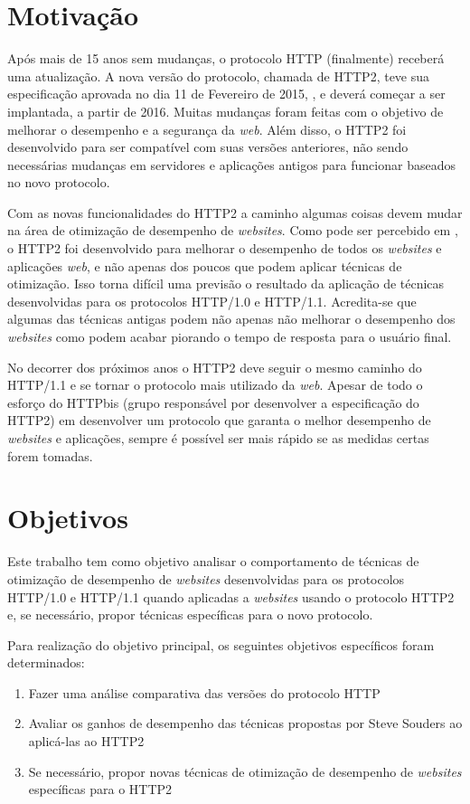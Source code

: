 \section{Motivação}
\label{sec:motivacao}

Após mais de 15 anos sem mudanças, o protocolo HTTP (finalmente) receberá uma atualização. A nova versão do protocolo, chamada de HTTP2, teve sua especificação aprovada no dia 11 de Fevereiro de 2015, \cite{HTTP2Spec}, e deverá começar a ser implantada, a partir de 2016. Muitas mudanças foram feitas com o objetivo de melhorar o desempenho e a segurança da \textit{web}. Além disso, o HTTP2 foi desenvolvido para ser compatível com suas versões anteriores, não sendo necessárias mudanças em servidores e aplicações antigos para funcionar baseados no novo protocolo.

Com as novas funcionalidades do HTTP2 a caminho algumas coisas devem mudar na área de otimização de desempenho de \textit{websites}. Como pode ser percebido em \cite{HTTP2Explained}, o HTTP2 foi desenvolvido para melhorar o desempenho de todos os \textit{websites} e aplicações \textit{web}, e não apenas dos poucos que podem aplicar técnicas de otimização. Isso torna difícil uma previsão o resultado da aplicação de técnicas desenvolvidas para os protocolos HTTP/1.0 e HTTP/1.1. Acredita-se que algumas das técnicas antigas podem não apenas não melhorar o desempenho dos \textit{websites} como podem acabar piorando o tempo de resposta para o usuário final.

No decorrer dos próximos anos o HTTP2 deve seguir o mesmo caminho do HTTP/1.1 e se tornar o protocolo mais utilizado da \textit{web}. Apesar de todo o esforço do HTTPbis (grupo responsável por desenvolver a especificação do HTTP2) em desenvolver um protocolo que garanta o melhor desempenho de \textit{websites} e aplicações, sempre é possível ser mais rápido se as medidas certas forem tomadas.

\section{Objetivos}
\label{sec:objetivos}

Este trabalho tem como objetivo analisar o comportamento de técnicas de otimização de desempenho de \textit{websites} desenvolvidas para os protocolos HTTP/1.0 e HTTP/1.1 quando aplicadas a \textit{websites} usando o protocolo HTTP2 e, se necessário, propor técnicas específicas para o novo protocolo.

Para realização do objetivo principal, os seguintes objetivos específicos foram determinados:

\begin{enumerate}
	\item Fazer uma análise comparativa das versões do protocolo HTTP
	\item Avaliar os ganhos de desempenho das técnicas propostas por Steve Souders ao aplicá-las ao HTTP2
	\item Se necessário, propor novas técnicas de otimização de desempenho de \textit{websites} específicas para o HTTP2
\end{enumerate}